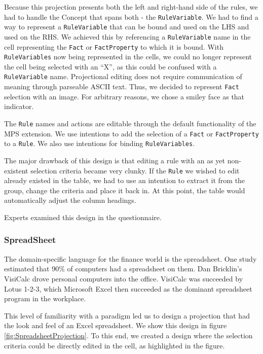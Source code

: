 Because this projection presents both the left and right-hand side of the rules, we had to handle the Concept that spans both - the \texttt{RuleVariable}.
We had to find a way to represent a \texttt{RuleVariable} that can be bound and used on the LHS and used on the RHS.
We achieved this by referencing a \texttt{RuleVariable} name in the cell representing the \texttt{Fact} or \texttt{FactProperty} to which it is bound.
With \texttt{RuleVariables} now being represented in the cells, we could no longer represent the cell being selected with an ``X'', as this could be confused with a \texttt{RuleVariable} name.
Projectional editing does not require communication of meaning through parseable ASCII text.
Thus, we decided to represent \texttt{Fact} selection with an image.
For arbitrary reasons, we chose a smiley face as that indicator.

The \texttt{Rule} names and actions are editable through the default functionality of the MPS extension.
We use intentions to add the selection of a \texttt{Fact} or \texttt{FactProperty} to a \texttt{Rule}.
We also use intentions for binding \texttt{RuleVariables}.

The major drawback of this design is that editing a rule with an as yet non-existent selection criteria became very clunky.
If the \texttt{Rule} we wished to edit already existed in the table, we had to use an intention to extract it from the group, change the criteria and place it back in.
At this point, the table would automatically adjust the column headings.

Experts examined this design in the questionnaire.

\subsubsection{SpreadSheet}

The domain-specific language for the finance world is the spreadsheet.
One study estimated that 90\% of computers had a spreadsheet on them\cite{bradley2009using}.
Dan Bricklin's VisiCalc drove personal computers into the office.
VisiCalc was succeeded by Lotus 1-2-3, which Microsoft Excel then succeeded as the dominant spreadsheet program in the workplace.

This level of familiarity with a paradigm led us to design a projection that had the look and feel of an Excel spreadsheet.
We show this design in figure \ref{fig:SpreadsheetProjection}.
To this end, we created a design where the selection criteria could be directly edited in the cell, as highlighted in the figure.

